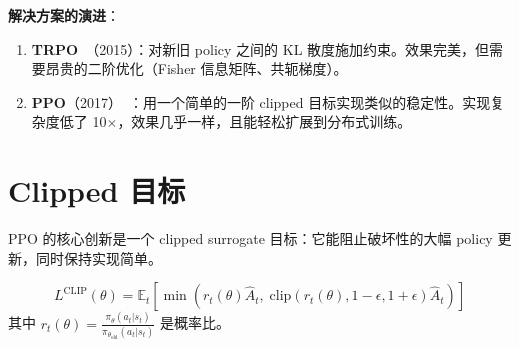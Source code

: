 \textbf{解决方案的演进}：

\begin{enumerate}
  \item \textbf{TRPO}~\cite{schulman2015trust}（2015）：对新旧 policy 之间的 KL 散度施加约束。效果完美，但需要昂贵的二阶优化（Fisher 信息矩阵、共轭梯度）。
  \item \textbf{PPO}（2017）~\cite{schulman2017proximal}：用一个简单的一阶 clipped 目标实现类似的稳定性。实现复杂度低了 10$\times$，效果几乎一样，且能轻松扩展到分布式训练。
\end{enumerate}

\section{Clipped 目标}
\label{the-clipped-objective}
\label{the-ppo-algorithm}

PPO 的核心创新是一个 clipped surrogate 目标：它能阻止破坏性的大幅 policy 更新，同时保持实现简单。

\begin{equation}
\boxed{L^{\text{CLIP}}(\theta) = \mathbb{E}_t\left[\min\left(r_t(\theta)\hat{A}_t,\; \text{clip}(r_t(\theta), 1{-}\epsilon, 1{+}\epsilon)\hat{A}_t\right)\right]}
\end{equation}
其中 $r_t(\theta) = \frac{\pi_\theta(a_t|s_t)}{\pi_{\theta_\text{old}}(a_t|s_t)}$ 是概率比。

